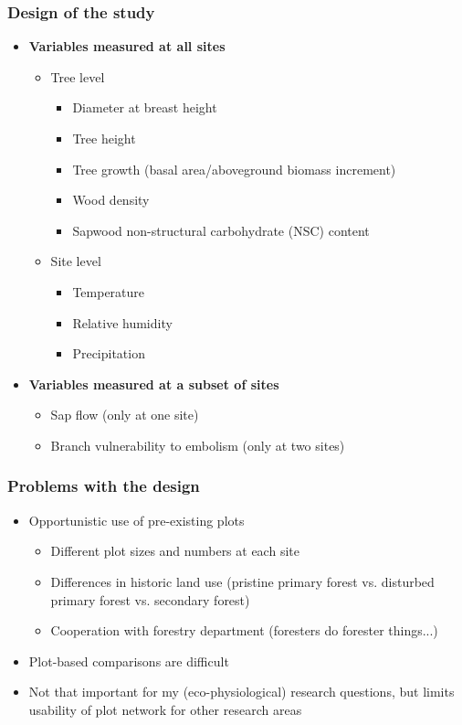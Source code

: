 \documentclass[usepdftitle=false]{beamer}
\newcommand{\Blue}[1]{{\color{blue!50!black}\textbf{#1}}}
\newcommand{\rar}{$\rightarrow$}
\newcommand{\Rar}{$\Rightarrow$}
\begin{document}
\begin{frame}
	\frametitle{Design of the study}
	\begin{itemize}
		\item \Blue{Variables measured at all sites}
		\begin{itemize}
			\item \alert<1>{Tree level}
			\begin{itemize}
				\item Diameter at breast height
				\item Tree height
				\item Tree growth (basal area/aboveground biomass increment)
				\item Wood density
				\item Sapwood non-structural carbohydrate (NSC) content
			\end{itemize}
			 \item<2->  \alert<2>{Site level}
			  \begin{itemize}
			  	\item Temperature
			  	\item Relative humidity 
			  	\item Precipitation
			  \end{itemize}
		\end{itemize}		
		\item<3> \Blue{Variables measured at a subset of sites}
		\begin{itemize}
			\item  \alert<3>{Sap flow} (only at one site)
			\item  \alert<3>{Branch vulnerability to embolism} (only at two sites)
		\end{itemize}
	\end{itemize}
\end{frame}

\begin{frame}
	\frametitle{Problems with the design}
	\begin{itemize}
		\item<+-> \alert<1>{Opportunistic use of pre-existing plots}
		\begin{itemize}
			\item<+-| alert@+> Different plot sizes and numbers at each site
			\item<+-| alert@+> Differences in historic land use (pristine primary forest vs. disturbed primary forest vs. secondary forest)
			\item<+-| alert@+> Cooperation with forestry department (foresters do forester things...)
		\end{itemize}	
		\item<visible@+-| alert@+>[\rar] Plot-based comparisons are difficult
		\item<visible@+-| alert@+>[\Rar] Not that important for my (eco-physiological) research questions, but limits usability of plot network for other research areas
	\end{itemize}
\end{frame}
\end{document}
